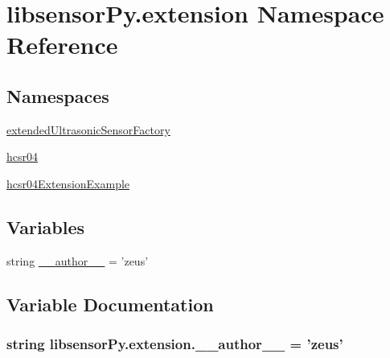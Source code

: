 \hypertarget{namespacelibsensorPy_1_1extension}{}\section{libsensor\+Py.\+extension Namespace Reference}
\label{namespacelibsensorPy_1_1extension}
\subsection*{Namespaces}
\begin{DoxyCompactItemize}
\item 
 \hyperlink{namespacelibsensorPy_1_1extension_1_1extendedUltrasonicSensorFactory}{extended\+Ultrasonic\+Sensor\+Factory}
\item 
 \hyperlink{namespacelibsensorPy_1_1extension_1_1hcsr04}{hcsr04}
\item 
 \hyperlink{namespacelibsensorPy_1_1extension_1_1hcsr04ExtensionExample}{hcsr04\+Extension\+Example}
\end{DoxyCompactItemize}
\subsection*{Variables}
\begin{DoxyCompactItemize}
\item 
string \hyperlink{namespacelibsensorPy_1_1extension_a828cd5869c2cf6f9dd618a2d945a6e53}{\+\_\+\+\_\+author\+\_\+\+\_\+} = 'zeus'
\end{DoxyCompactItemize}


\subsection{Variable Documentation}
\hypertarget{namespacelibsensorPy_1_1extension_a828cd5869c2cf6f9dd618a2d945a6e53}{}
\subsubsection[{\+\_\+\+\_\+author\+\_\+\+\_\+}]{\setlength{\rightskip}{0pt plus 5cm}string libsensor\+Py.\+extension.\+\_\+\+\_\+author\+\_\+\+\_\+ = 'zeus'}\label{namespacelibsensorPy_1_1extension_a828cd5869c2cf6f9dd618a2d945a6e53}
